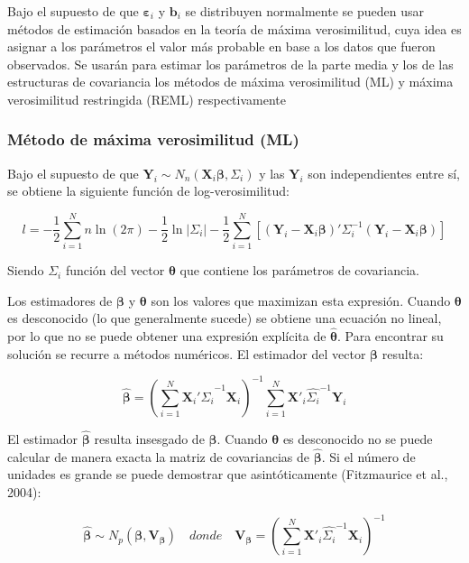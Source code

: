 \documentclass[spanish]{article}
\numberwithin{figure}{subsection}
\numberwithin{equation}{subsection}
\numberwithin{table}{subsection}
\begin{document}
Bajo el supuesto de que $\bm{\varepsilon}_i$ y $\bm{b}_i$ se distribuyen normalmente se
pueden usar métodos de estimación basados en la teoría de máxima verosimilitud,
cuya idea es asignar a los parámetros el valor más probable en base a los datos
que fueron observados. Se usarán para estimar los parámetros de la parte media
y los de las estructuras de covariancia los métodos de máxima verosimilitud
(ML) y máxima verosimilitud restringida (REML) respectivamente

\subsubsection{Método de máxima verosimilitud (ML)}

Bajo el supuesto de que $\bm{Y}_i \sim N_n(\bm{X}_i \bm{\beta},
\bm{\varSigma}_i)$ y las $\bm{Y}_i$
son independientes entre sí, se obtiene la siguiente función de
log-verosimilitud:

\begin{equation}
\label{ML}
	l = -\frac{1}{2} \sum_{i=1}^{N}n \ln(2\pi) - \frac{1}{2}\ln|\bm{\varSigma}_i| -
	\frac{1}{2} \sum_{i=1}^{N} [(\bm{Y}_i - \bm{X}_i\bm{\beta})'
	\bm{\varSigma}_i^{-1} (\bm{Y}_i - \bm{X}_i\bm{\beta})]
\end{equation}

Siendo $\bm{\varSigma}_i$ función del vector $\bm{\theta}$ que contiene los
parámetros de covariancia.

Los estimadores de $\bm{\beta}$ y $\bm{\theta}$ son los valores que maximizan
esta expresión. Cuando $\bm{\theta}$ es desconocido (lo que generalmente sucede)
se obtiene una ecuación no lineal, por lo que no se puede obtener una expresión
explícita de $\hat{\bm{\theta}}$. Para encontrar su solución se recurre a
métodos numéricos. El estimador del vector $\bm{\beta}$ resulta:

\[ \hat{\bm{\beta}} = (\sum_{i=1}^{N} \bm{X}_i'\hat{\bm{\varSigma}_i}^{-1}\bm{X}_i)^{-1}
\sum_{i=1}^{N} \bm{X}'_i\hat{\bm{\varSigma}_i}^{-1}\bm{Y}_i \]

El estimador $\hat{\bm{\beta}}$ resulta insesgado de $\bm{\beta}$. Cuando
$\bm{\theta}$ es desconocido no se puede calcular de manera exacta la matriz
de covariancias de $\hat{\bm{\beta}}$. Si el número de unidades es grande se
puede demostrar que asintóticamente (Fitzmaurice et al., 2004):

\[ \hat{\bm{\beta}} \sim N_p(\bm{\beta}, \bm{V}_{\bm{\beta}}) \quad donde \quad \bm{V}_{\bm{\beta}} =
(\sum_{i=1}^{N} \bm{X}'_i\hat{\bm{\varSigma}_i}^{-1}\bm{X}_i)^{-1} \]
\end{document}
